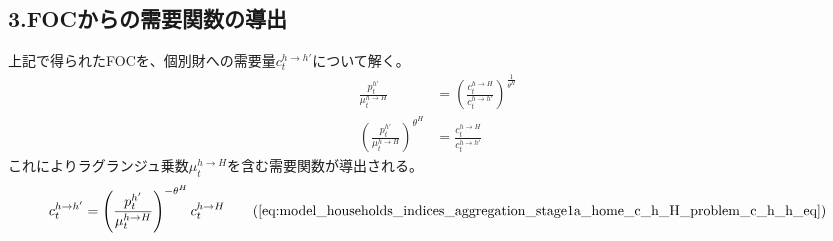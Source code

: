 \subsection*{3.FOCからの需要関数の導出}
\label{sec:appendix_cost_minimization_sub3}
上記で得られたFOCを、個別財への需要量\(c_t^{h\to h'}\)について解く。
\begin{align}
    \frac{p_t^{h'}}{\mu_t^{h\to H}}&=\left(\frac{c_t^{h\to H}}{c_t^{h\to h'}}\right)^{\frac{1}{\theta^H}} \label{eq:appendix_cost_minimization_sub3_demand_step1} \\
    \left(\frac{p_t^{h'}}{\mu_t^{h\to H}}\right)^{\theta^H}&=\frac{c_t^{h\to H}}{c_t^{h\to h'}}
    \label{eq:appendix_cost_minimization_sub3_demand_step2}
\end{align}
これによりラグランジュ乗数\(\mu_t^{h\to H}\)を含む需要関数が導出される。
\begin{equation}
c_t^{h\to h'}=\left(\frac{p_t^{h'}}{\mu_t^{h\to H}}\right)^{-\theta^H}c_t^{h\to H}
\tag{\ref{eq:model_households_indices_aggregation_stage1a_home_c_h_H_problem_c_h_h_eq}}
\end{equation}

